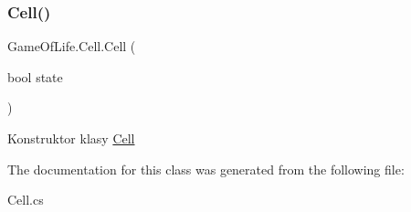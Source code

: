 \subsubsection{\texorpdfstring{Cell()}{Cell()}}
{\footnotesize\ttfamily Game\+Of\+Life.\+Cell.\+Cell (\begin{DoxyParamCaption}\item[{bool}]{state }\end{DoxyParamCaption})\hspace{0.3cm}{\ttfamily [inline]}}



Konstruktor klasy \mbox{\hyperlink{class_game_of_life_1_1_cell}{Cell}} 



The documentation for this class was generated from the following file\+:\begin{DoxyCompactItemize}
\item 
Cell.\+cs\end{DoxyCompactItemize}
